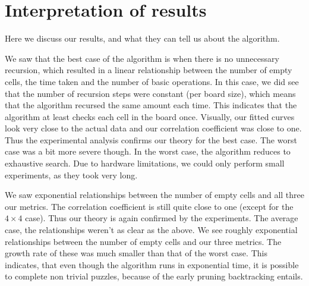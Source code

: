 \documentclass[16pt]{article}
\begin{document}
\section{Interpretation of results}
Here we discuss our results, and what they can tell us about the algorithm.

We saw that the best case of the algorithm is when there is no unnecessary recursion, 
which resulted in a linear relationship between the number of empty cells, the time taken and the number of basic operations.
In this case, we did see that the number of recursion steps were constant (per board size), which means that the algorithm recursed the same amount each time. 
This indicates that the algorithm at least checks each cell in the board once.
\newline
\newline
Visually, our fitted curves look very close to the actual data and our correlation coefficient was close to one.
Thus the experimental analysis confirms our theory for the best case.
\newline
\newline
The worst case was a bit more severe though. In the worst case, the algorithm reduces to exhaustive search.
Due to hardware limitations, we could only perform small experiments, as they took very long.

We saw exponential relationships between the number of empty cells and all three our metrics.
The correlation coefficient is still quite close to one (except for the $4 \times 4$ case). Thus our theory is again confirmed by the experiments.
\newline
\newline
The average case, the relationships weren't as clear as the above. We see roughly exponential relationships between the number of empty cells and our three metrics.
The growth rate of these was much smaller than that of the worst case.
This indicates, that even though the algorithm runs in exponential time, it is possible to complete non trivial puzzles, because of the early pruning backtracking entails.
\end{document}
